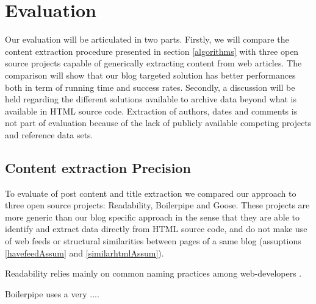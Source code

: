 \section{Evaluation}

Our evaluation will be articulated in two parts. Firstly, we will compare the content extraction procedure presented in section \ref{algorithms} with three open source projects capable of generically extracting content from web articles. The comparison will show that our blog targeted solution has better performances both in term of running time and success rates. Secondly, a discussion will be held regarding the different solutions available to archive data beyond what is available in HTML source code. Extraction of authors, dates and comments is not part of evaluation because of the lack of publicly available competing projects and reference data sets.


\subsection{Content extraction Precision}
To evaluate of post content and title extraction we compared our approach to three open source projects: Readability\cite{}, Boilerpipe\cite{kohlschuetter2010} and Goose\cite{}. These projects are more generic than our blog specific approach in the sense that they are able to identify and extract data directly from HTML source code, and do not make use of web feeds or structural similarities between pages of a same blog (assuptions \ref{havefeedAssum} and \ref{similarhtmlAssum}).

Readability relies mainly on common naming practices among web-developers  .


Boilerpipe uses a very ....

